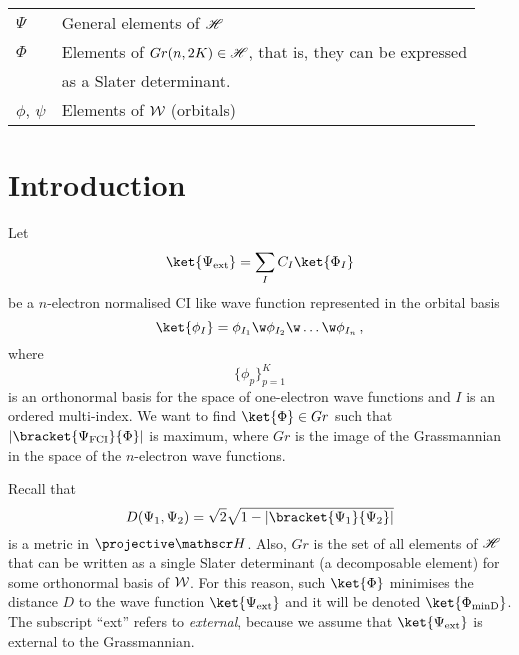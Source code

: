 \documentclass[a4paper,11pt]{article}
\begin{document}
\begin{center}
\begin{tabular}{ll}
    $\Psi$              & General elements of $\mathscr{H}$                                            \\
    $\Phi$              & Elements of $Gr(n, 2K) \in \mathscr{H}$, that is, they can be expressed      \\
                        & as a Slater determinant.                                                 \\
    $\phi$, $\psi$      & Elements of $\mathcal{W}{}$ (orbitals)                                        \\
    \hline
  \end{tabular}
\end{center}

\newpage
\section{Introduction}

Let
\begin{equation}\label{eq:ext_wf}
  \ket{\Psi_\text{ext}} = \sum_I C_I \ket{\Phi_I}
\end{equation}
be a $n$-electron normalised CI like wave function represented in the orbital basis
\begin{equation}
  \ket{\phi_I} = \phi_{I_1} \w \phi_{I_2} \w \dots \w \phi_{I_n}\,,
\end{equation}
where
\begin{equation}
  \{\phi_p\}_{p=1}^K
\end{equation}
is an orthonormal basis for the space of one-electron wave functions and $I$ is an ordered multi-index.
We want to find $\ket{\Phi} \in Gr$ such that $|\bracket{\Psi_\text{FCI}}{\Phi}|$ is maximum, where $Gr$ is the image of the Grassmannian in the space of the $n$-electron wave functions.

Recall that
\begin{equation}
  D(\Psi_1, \Psi_2) = \sqrt{2}\sqrt{1 - |\bracket{\Psi_1}{\Psi_2}|}
\end{equation}
is a metric in $\projective \HilbSp$.\cite{}
Also, $Gr$ is the set of all elements of $\mathscr{H}$ that can be written as a single Slater determinant (a decomposable element) for some orthonormal basis of $\mathcal{W}{}$.
For this reason, such $\ket{\Phi}$ minimises the distance $D$ to the wave function $\ket{\Psi_\text{ext}}$ and it will be denoted $\ket{\Phi_\text{minD}}$.
The subscript ``ext'' refers to \emph{external}, because we assume that $\ket{\Psi_\text{ext}}$ is external to the Grassmannian.
\end{document}

